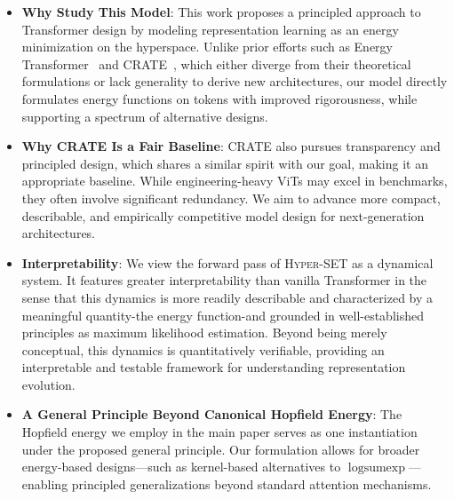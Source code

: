 \begin{itemize}[leftmargin=*]
    \item \textbf{Why Study This Model}: This work proposes a principled approach to Transformer design by modeling representation learning as an energy minimization on the hyperspace. Unlike prior efforts such as Energy Transformer~\citep{hoover2024energy} and \textsc{CRATE}~\citep{yu2023white}, which either diverge from their theoretical formulations or lack generality to derive new architectures, our model directly formulates energy functions on tokens with improved rigorousness, while supporting a spectrum of alternative designs.

    \item \textbf{Why \textsc{CRATE} Is a Fair Baseline}: \textsc{CRATE} \citep{yu2023white} also pursues transparency and principled design, which shares a similar spirit with our goal, making it an appropriate baseline. While engineering-heavy ViTs may excel in benchmarks, they often involve significant redundancy. We aim to advance more compact, describable, and empirically competitive model design for next-generation architectures.
    
    \item \textbf{Interpretability}: We view the forward pass of \textsc{Hyper-SET} as a dynamical system. It features greater interpretability than vanilla Transformer in the sense that this dynamics is more readily describable and characterized by a meaningful quantity-the energy function-and grounded in well-established principles as maximum likelihood estimation. Beyond being merely conceptual, this dynamics is quantitatively verifiable, providing an interpretable and testable framework for understanding representation evolution.
    
    \item \textbf{A General Principle Beyond Canonical Hopfield Energy}: The Hopfield energy we employ in the main paper serves as one instantiation under the proposed general principle. Our formulation allows for broader energy-based designs—such as kernel-based alternatives to $\operatorname{logsumexp}$—enabling principled generalizations beyond standard attention mechanisms.
    
    
\end{itemize}
